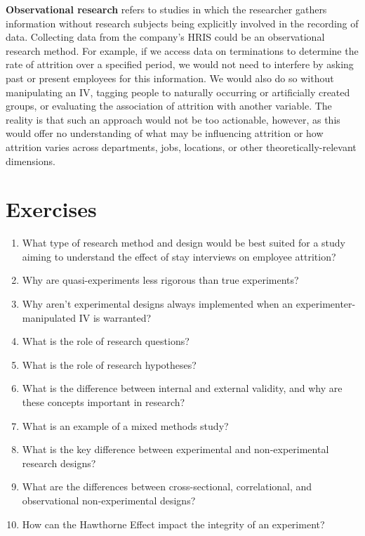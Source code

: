 \documentclass[]{book}
\begin{document}
\textbf{Observational research} refers to studies in which the researcher gathers information without research subjects being explicitly involved in the recording of data. Collecting data from the company's HRIS could be an observational research method. For example, if we access data on terminations to determine the rate of attrition over a specified period, we would not need to interfere by asking past or present employees for this information. We would also do so without manipulating an IV, tagging people to naturally occurring or artificially created groups, or evaluating the association of attrition with another variable. The reality is that such an approach would not be too actionable, however, as this would offer no understanding of what may be influencing attrition or how attrition varies across departments, jobs, locations, or other theoretically-relevant dimensions.

\hypertarget{exercises-2}{%
\section{Exercises}\label{exercises-2}}

\begin{enumerate}
\def\labelenumi{\arabic{enumi}.}
\item
  What type of research method and design would be best suited for a study aiming to understand the effect of stay interviews on employee attrition?
\item
  Why are quasi-experiments less rigorous than true experiments?
\item
  Why aren't experimental designs always implemented when an experimenter-manipulated IV is warranted?
\item
  What is the role of research questions?
\item
  What is the role of research hypotheses?
\item
  What is the difference between internal and external validity, and why are these concepts important in research?
\item
  What is an example of a mixed methods study?
\item
  What is the key difference between experimental and non-experimental research designs?
\item
  What are the differences between cross-sectional, correlational, and observational non-experimental designs?
\item
  How can the Hawthorne Effect impact the integrity of an experiment?
\end{enumerate}
\end{document}
